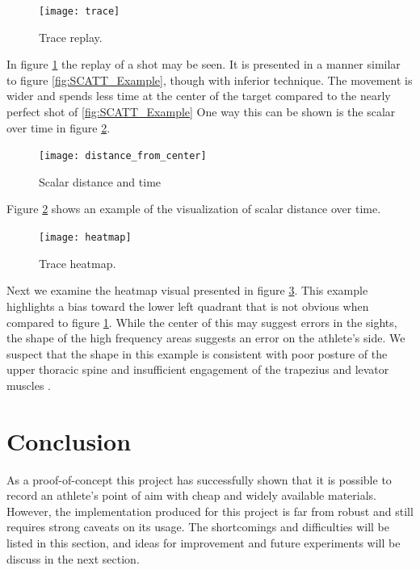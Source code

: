 \documentclass[conference]{IEEEtran}
\begin{document}
\begin{figure}[]
	\centering
	\texttt{[image: trace]}
	\caption{Trace replay.}
	\label{fig:trace}
\end{figure}

In figure \ref{fig:trace} the replay of a shot may be seen.
It is presented in a manner similar to figure \ref{fig:SCATT_Example}, 
though with inferior technique.
The movement is wider and spends less time at the center of the target compared to the nearly perfect shot of  \ref{fig:SCATT_Example}
One way this can be shown is the scalar over time in figure \ref{fig:dfc}.

\begin{figure}[]
	\centering
	\texttt{[image: distance\_from\_center]}
	\caption{Scalar distance and time}
	\label{fig:dfc}
\end{figure}

Figure \ref{fig:dfc} shows an example of the visualization of scalar distance over time. 


\begin{figure}[]
	\centering
	\texttt{[image: heatmap]}
	\caption{Trace heatmap.}
	\label{fig:heatmap}
\end{figure}

Next we examine the heatmap visual presented in figure \ref{fig:heatmap}.
This example highlights a bias toward the lower left quadrant that is not obvious when compared to figure \ref{fig:trace}.
While the center of this may suggest errors in the sights, the shape of the high frequency areas suggests an error on the athlete's side.
We suspect that the shape in this example is consistent with poor posture of the upper thoracic spine and insufficient engagement of the trapezius and levator muscles \cite{Simo2018}.





\section{Conclusion}

As a proof-of-concept this project has successfully shown that it is possible to record an athlete's point of aim with cheap and widely available materials.
However, the implementation produced for this project is far from robust and still requires strong caveats on its usage.
The shortcomings and difficulties will be listed in this section, 
and ideas for improvement and future experiments will be discuss in the next section.
\end{document}
